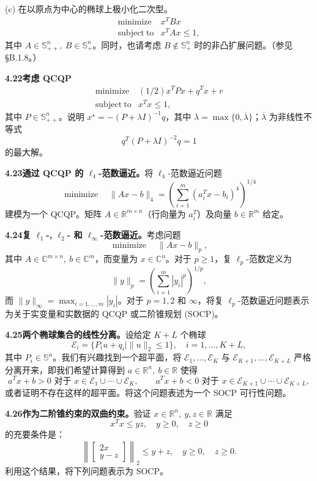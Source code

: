 \documentclass[UTF8, 12pt, fontset=fandol, oneside]{ctexart}
\begin{document}
(c) 在以原点为中心的椭球上极小化二次型。
\[
\begin{array}{ll}
\mathop{\mathrm{minimize}} & x^TBx\\
\mathrm{subject\ to} & x^TAx\leq1,
\end{array}
\]
其中 $A\in\mathbb{S}_{++}^n,\ B\in\mathbb{S}_+^n$。同时，也请考虑 $B\notin\mathbb{S}_+^n$ 时的非凸扩展问题。（参见 \S B.1.8。）

\noindent\textbf{4.22\quad 考虑 QCQP}
\[
\begin{array}{ll}
\mathop{\mathrm{minimize}} & (1/2)x^TPx+q^Tx+r\\
\mathrm{subject\ to} & x^Tx\leq1,
\end{array}
\]
其中 $P\in\mathbb{S}_{++}^n$。说明 $x^\star=-(P+\lambda I)^{-1}q$，其中 $\lambda=\max\{0,\overline{\lambda}\}$；$\overline{\lambda}$ 为非线性不等式
\[
q^T(P+\lambda I)^{-2}q=1
\]
的最大解。

\noindent\textbf{4.23\quad 通过 QCQP 的 $\ell_4$-范数逼近。}\quad 将 $\ell_4$-范数逼近问题
\[
\mathop{\mathrm{minimize}}\quad \|Ax-b\|_4=\left(\sum_{i=1}^m(a_i^Tx-b_i)^4\right)^{1/4}
\]
建模为一个 QCQP。矩阵 $A\in\mathbb{R}^{m\times n}$（行向量为 $a_i^T$）及向量 $b\in\mathbb{R}^m$ 给定。

\noindent\textbf{4.24\quad 复 $\ell_1$-, $\ell_2$- 和 $\ell_\infty$-范数逼近。}\quad 考虑问题
\[
\mathop{\mathrm{minimize}}\quad \|Ax-b\|_p,
\]
其中 $A\in\mathbb{C}^{m\times n},\ b\in\mathbb{C}^m$，而变量为 $x\in\mathbb{C}^n$。对于 $p\geq1$，复 $\ell_p$-范数定义为
\[
\|y\|_p=\left(\sum_{i=1}^m |y_i|^p\right)^{1/p},
\]
而 $\|y\|_\infty=\max_{i=1,\ldots,m}|y_i|$。对于 $p=1,2$ 和 $\infty$，将复 $\ell_p$-范数逼近问题表示为关于实变量和实数据的 QCQP 或二阶锥规划 (SOCP)。

\noindent\textbf{4.25\quad 两个椭球集合的线性分离。}\quad 设给定 $K+L$ 个椭球
\[
\mathcal{E}_i=\{P_iu+q_i\mid \|u\|_2\leq1\},\quad i=1,\ldots,K+L,
\]
其中 $P_i\in\mathbb{S}^n$。我们有兴趣找到一个超平面，将 $\mathcal{E}_1,\ldots,\mathcal{E}_K$ 与 $\mathcal{E}_{K+1},\ldots,\mathcal{E}_{K+L}$ 严格分离开来，即我们希望计算得到 $a\in\mathbb{R}^n,\ b\in\mathbb{R}$ 使得
\[
a^Tx+b>0\text{ 对于 }x\in\mathcal{E}_1\cup\cdots\cup\mathcal{E}_K,\qquad
a^Tx+b<0\text{ 对于 }x\in\mathcal{E}_{K+1}\cup\cdots\cup\mathcal{E}_{K+L},
\]
或者证明不存在这样的超平面。将这个问题表述为一个 SOCP 可行性问题。

\noindent\textbf{4.26\quad 作为二阶锥约束的双曲约束。}\quad 验证 $x\in\mathbb{R}^n,\ y,z\in\mathbb{R}$ 满足
\[
x^Tx\leq yz,\quad y\geq0,\quad z\geq0
\]
的充要条件是：
\[
\left\|\begin{bmatrix}2x\\ y-z\end{bmatrix}\right\|_2\leq y+z,\quad y\geq0,\quad z\geq0.
\]
利用这个结果，将下列问题表示为 SOCP。
\end{document}
